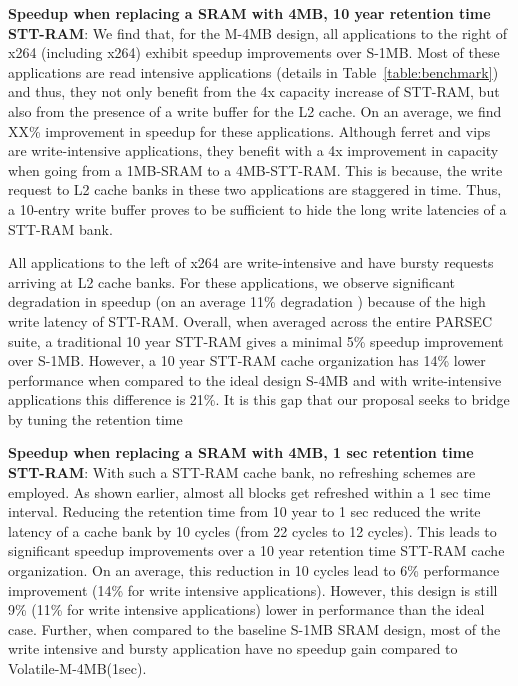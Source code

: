 {\bf Speedup when replacing a SRAM with 4MB, 10 year retention time STT-RAM}: We find that, for the M-4MB design, all applications to the right of x264 (including x264) exhibit speedup improvements over S-1MB. Most of these applications are read intensive applications (details in Table~\ref{table:benchmark}) and thus, they not only benefit from the 4x capacity increase of STT-RAM, but also from the presence of a write buffer for the L2 cache. On an average, we find XX\% improvement in speedup for these applications. Although ferret and vips are write-intensive applications, they benefit with a 4x improvement in capacity when going from a 1MB-SRAM to a 4MB-STT-RAM. This is because, the write request to L2 cache banks in these two applications are staggered in time. Thus, a 10-entry write buffer proves to be sufficient to hide the long write latencies of a STT-RAM bank.

All applications to the left of x264 are write-intensive and have bursty requests arriving at L2 cache banks. For these applications, we observe significant degradation in speedup (on an average 11\% degradation ) because of the high write latency of STT-RAM.
Overall, when averaged across the entire PARSEC suite, a traditional 10 year STT-RAM gives a minimal 5\% speedup improvement over S-1MB. However, a 10 year STT-RAM cache organization has 14\% lower performance when compared to the ideal design S-4MB and with write-intensive applications this difference is 21\%. It is this gap that our proposal seeks to bridge by tuning the retention time

{\bf Speedup when replacing a SRAM with 4MB, 1 sec retention time STT-RAM}: With such a STT-RAM cache bank, no refreshing schemes are employed. As shown earlier, almost all blocks get refreshed within a 1 sec time interval. Reducing the retention time from 10 year to 1 sec reduced the write latency of a cache bank by 10 cycles (from 22 cycles to 12 cycles). This leads to significant speedup improvements over a 10 year retention time STT-RAM cache organization. On an average, this reduction in 10 cycles lead to 6\% performance improvement (14\% for write intensive applications). However, this design is still 9\% (11\% for write intensive applications) lower in performance than the ideal case.
Further, when compared to the baseline S-1MB SRAM design, most of the write intensive and bursty application have no speedup gain compared to
Volatile-M-4MB(1sec).

